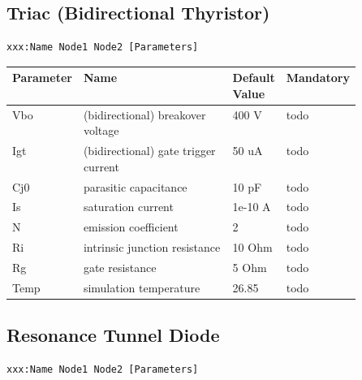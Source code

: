 \subsection{Triac (Bidirectional Thyristor)}

\begin{verbatim}
xxx:Name Node1 Node2 [Parameters]
\end{verbatim}


\begin{tabular}{|l|p{0.5\linewidth}|l|l|}
\hline
Parameter & Name & Default Value & Mandatory \\
\hline
Vbo & (bidirectional) breakover voltage & 400 V & todo \\
Igt & (bidirectional) gate trigger current & 50 uA & todo \\
Cj0 & parasitic capacitance & 10 pF & todo \\
Is & saturation current & 1e-10 A & todo \\
N & emission coefficient & 2 & todo \\
Ri & intrinsic junction resistance & 10 Ohm & todo \\
Rg & gate resistance & 5 Ohm & todo \\
Temp & simulation temperature & 26.85 & todo \\
\hline
\end{tabular}



\subsection{Resonance Tunnel Diode}

\begin{verbatim}
xxx:Name Node1 Node2 [Parameters]
\end{verbatim}


